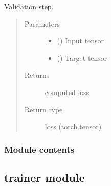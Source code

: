 \documentclass[letterpaper,10pt,english,openany,oneside]{sphinxmanual}
\begin{document}
\begin{fulllineitems}
\begin{fulllineitems}
\label{\detokenize{nn:nn.sequential.Sequential.validation_step}}
Validation step.
\begin{quote}\begin{description}
\item[{Parameters}] \leavevmode\begin{itemize}
\item {} 
 () \textendash{} Input tensor

\item {} 
 () \textendash{} Target tensor

\end{itemize}

\item[{Returns}] \leavevmode
computed loss

\item[{Return type}] \leavevmode
loss (torch.tensor)

\end{description}\end{quote}

\end{fulllineitems}


\end{fulllineitems}



\subsubsection{Module contents}
\label{\detokenize{nn:module-nn}}\label{\detokenize{nn:module-contents}}

\subsection{trainer module}
\label{\detokenize{trainer:module-trainer}}\label{\detokenize{trainer:trainer-module}}\label{\detokenize{trainer::doc}}
\end{document}
